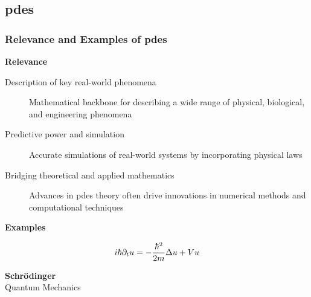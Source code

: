 \subsection{\texorpdfstring{\acrlong{pdes}}{}}

\begin{frame}
    \frametitle{Relevance and Examples of \acrfull{pdes}}

    \vspace*{\fill}
    \begin{center}
        {\color{\accentcolor} \Large \textbf{Relevance}}
    \end{center}

    \vspace*{0.125cm}

    \begin{center}
        \begin{minipage}{0.75\textwidth}
            \begin{description}
                \item[Description of key real-world phenomena] Mathematical backbone for describing a wide range of physical, biological, and engineering phenomena
                \item[Predictive power and simulation] Accurate simulations of real-world systems by incorporating physical laws
                \item[Bridging theoretical and applied mathematics] Advances in \acrshort{pdes} theory often drive innovations in numerical methods and computational techniques
            \end{description}
        \end{minipage}
    \end{center}

    \vspace*{\fill}

    \begin{center}
        {\color{\accentcolor} \Large \textbf{Examples}}
    \end{center}

    \begin{multicols}{3}

        \begin{center}
            \begin{align*}
                i \hbar \partial_t u = - \frac{\hbar^2}{2 m} \Delta u + V u
            \end{align*}
            
            \vspace*{0.125cm}
            {\large \textbf{Schrödinger}} \\
            Quantum Mechanics
        \end{center}


\end{multicols}
\end{frame}
